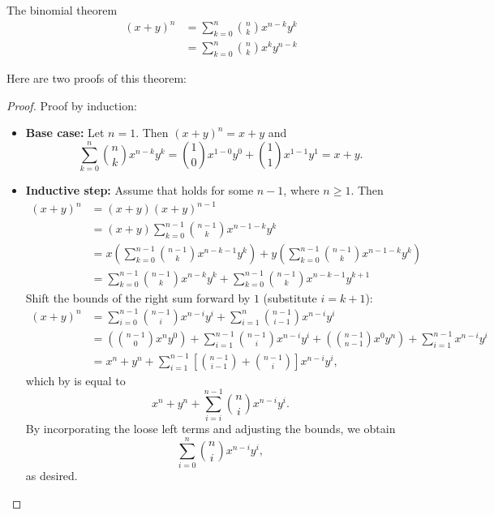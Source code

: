 \begin{bdef}{The binomial theorem}\label{bth}
    \[
        \begin{aligned}
            (x + y)^n &= \sum^n_{k = 0} {n \choose k} x^{n-k}y^k \\
            &= \sum^n_{k=0} {n \choose k} x^ky^{n-k}
        \end{aligned}
    \]
\end{bdef}
Here are two proofs of this theorem:
\begin{proof}
    Proof by induction:
    \begin{itemize}
        \item \textbf{Base case:}
            Let $n = 1$. Then $(x+y)^n = x + y$ and \[
                \sum^n_{k=0}{n \choose k} x^{n-k}y^{k} = {1 \choose 0} x^{1-0}y^0 + {1 \choose 1}x^{1-1}y^1 = x + y.    
            \]
        \item \textbf{Inductive step:} Assume that  holds for some $n-1$, where $n \geq 1$. Then \[
            \begin{aligned}
                (x+y)^{n} &= (x+y)(x+y)^{n-1} \\ 
                &= (x+y)\sum^{n-1}_{k=0}{n-1 \choose k}x^{n-1-k}y^k \\
                &= x\left(\sum^{n-1}_{k=0}{n-1 \choose k} x^{n-k-1}y^k\right) + y\left(\sum^{n-1}_{k=0}{n-1 \choose k} x^{n-1-k}y^k\right) \\
                &= \sum^{n-1}_{k=0} {n-1 \choose k} x^{n-k}y^k + \sum^{n-1}_{k = 0}{n-1 \choose k}x^{n-k-1}y^{k+1}
            \end{aligned}
        \] Shift the bounds of the right sum forward by $1$ (substitute $i = k+1$): \[
            \begin{aligned}
                (x+y)^{n} &= \sum^{n-1}_{i=0} {n-1 \choose i}x^{n-i}y^i + \sum^{n}_{i = 1} {n-1 \choose i - 1} x^{n-i}y^i \\ 
                &= \left( {n-1 \choose 0} x^ny^0 \right) + \sum^{n-1}_{i=1} {n-1 \choose i} x^{n-i}y^i + \left( {n - 1 \choose n - 1} x^{0}y^n \right) + \sum^{n-1}_{i=1} x^{n-i}y^i \\
                &= x^n + y^n + \sum^{n-1}_{i=1} \left[ {n-1 \choose i-1} + {n - 1 \choose i} \right] x^{n-i}y^i,
            \end{aligned}
        \] which by  is equal to \[
            x^n + y^n + \sum^{n-1}_{i=i} {n \choose i} x^{n-i}y^i.
        \] By incorporating the loose left terms and adjusting the bounds, we obtain \[
            \sum^{n}_{i=0} {n \choose i} x^{n-i}y^i,    
        \] as desired.
    \end{itemize}
\end{proof}
